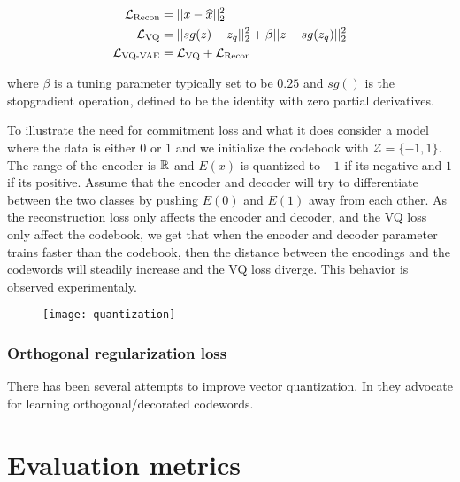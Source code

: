 \documentclass[../../thesis.tex]{subfiles}
\begin{document}
    \begin{equation}        
        \begin{aligned}
            \mathcal{L}_{\text{Recon}} &= ||x - \widehat{x}||_2^2\\
            \mathcal{L}_{\text{VQ}} &= ||sg(z) - z_q||_2^2 +\beta||z - sg(z_q)||_2^2\\
            \mathcal{L}_{\text{VQ-VAE}} &= \mathcal{L}_{\text{VQ}} + \mathcal{L}_{\text{Recon}}
        \end{aligned}
    \end{equation}

where $\beta$ is a tuning parameter typically set to be $0.25$ and $sg()$ is the stopgradient operation, defined to be the identity with zero partial derivatives. \newline

To illustrate the need for commitment loss and what it does consider a model where the data is either $0$ or $1$ and we initialize the codebook with $\mathcal{Z} = \{-1,1\}$.  The range of the encoder is $\mathbb{R}$ and $E(x)$ is quantized to $-1$ if its negative and $1$ if its positive. Assume that the encoder and decoder will try to differentiate between the two classes by pushing $E(0)$ and $E(1)$ away from each other. As the reconstruction loss only affects the encoder and decoder, and the VQ loss only affect the codebook, we get that when the encoder and decoder parameter trains faster than the codebook, then the distance between the encodings and the codewords will steadily increase and the VQ loss diverge. This behavior is observed experimentaly. \newline 

\begin{figure}[h]
    \texttt{[image: quantization]}
    \centering    
\end{figure}

\subsubsection{Orthogonal regularization loss}

There has been several attempts to improve vector quantization. In \cite{shin2023exploration} they advocate for learning orthogonal/decorated codewords. 



\section{Evaluation metrics}
\end{document}
